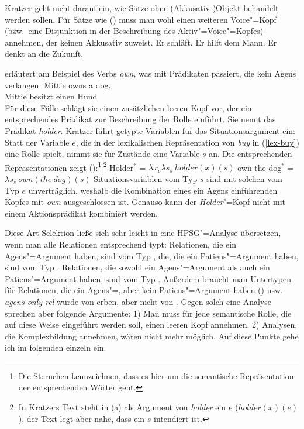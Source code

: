 {Kratzer geht nicht darauf ein, wie Sätze ohne (Akkusativ-)Objekt behandelt werden sollen. Für
Sätze wie () muss man wohl einen weiteren Voice"=Kopf (bzw.\ eine Disjunktion
in der Beschreibung des Aktiv"=Voice"=Kopfes) annehmen, der keinen Akkusativ zuweist.
\eal
\ex Er schläft.
\ex Er hilft dem Mann.
\ex Er denkt an die Zukunft.
\zl

\noindent
\citet[]{Kratzer96a} erläutert am Beispiel des Verbs \emph{own}, was mit Prädikaten passiert,
die kein Agens verlangen.
\ea
\gll Mittie owns a dog.\\
     Mittie besitzt einen Hund\\
\z
Für diese Fälle schlägt sie einen zusätzlichen leeren Kopf vor, der ein entsprechendes
Prädikat zur Beschreibung der Rolle einführt. Sie nennt das Prädikat \emph{holder}.
Kratzer führt getypte Variablen für das Situationsargument ein: Statt der Variable
$e$, die in der lexikalischen Repräsentation von \emph{buy} in (\ref{lex-buy}) eine Rolle
spielt, nimmt sie für Zustände eine Variable $s$ an. Die entsprechenden Repräsentationen
zeigt ():\footnote{
  Die Sternchen kennzeichnen, dass es hier um die semantische Repräsentation der entsprechenden
  Wörter geht.}$^,$\footnote{
  In Kratzers Text steht in (a) als Argument von \emph{holder} ein $e$ ($holder(x)(e)$),
  der Text legt aber nahe, dass ein $s$ intendiert ist.%
} 
\eal
\ex Holder$^*$ = $\lambda x_e \lambda s_s~holder(x)(s)$
\ex own the dog$^*$ = $\lambda s_s~own(the~dog)(s)$
\zl
Situationsvariablen vom Typ $s$ sind mit solchen vom Typ $e$ unverträglich, weshalb
die Kombination eines ein Agens einführenden Kopfes mit \emph{own} ausgeschlossen ist.
Genauso kann der \emph{Holder}"=Kopf nicht mit einem Aktionsprädikat kombiniert werden.

Diese Art Selektion ließe sich sehr leicht in eine HPSG"=Analyse übersetzen, wenn man
alle Relationen entsprechend typt: Relationen, die ein Agens"=Argument haben, sind vom Typ
, die, die ein Patiens"=Argument haben, sind vom Typ .
Relationen, die sowohl ein Agens"=Argument als auch ein Patiens"=Argument haben, sind
vom Typ . Außerdem braucht man Untertypen für Relationen, die
ein Agens"=, aber kein Patiens"=Argument haben () usw. \emph{agens-only-rel}
würde von  erben, aber nicht von . Gegen solch eine Analyse
sprechen aber folgende Argumente: 1) Man muss für jede semantische Rolle, die auf diese Weise
eingeführt werden soll, einen leeren Kopf annehmen. 
2) Analysen, die Komplexbildung annehmen, wären nicht mehr möglich. Auf diese Punkte gehe ich im folgenden einzeln ein. 

}
